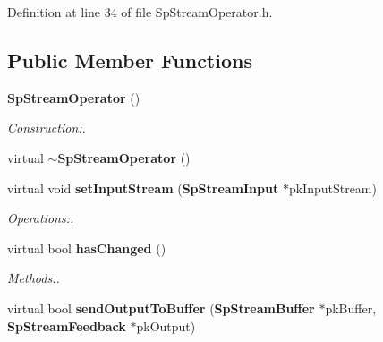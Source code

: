 Definition at line 34 of file Sp\-Stream\-Operator.h.\subsection*{Public Member Functions}
\begin{CompactItemize}
\item 
{\bf Sp\-Stream\-Operator} ()
\begin{CompactList}\small\item\em Construction:. \item\end{CompactList}\item 
virtual {\bf $\sim$Sp\-Stream\-Operator} ()
\item 
virtual void {\bf set\-Input\-Stream} ({\bf Sp\-Stream\-Input} $\ast$pk\-Input\-Stream)
\begin{CompactList}\small\item\em Operations:. \item\end{CompactList}\item 
virtual bool {\bf has\-Changed} ()
\begin{CompactList}\small\item\em Methods:. \item\end{CompactList}\item 
virtual bool {\bf send\-Output\-To\-Buffer} ({\bf Sp\-Stream\-Buffer} $\ast$pk\-Buffer, {\bf Sp\-Stream\-Feedback} $\ast$pk\-Output)
\end{CompactItemize}
